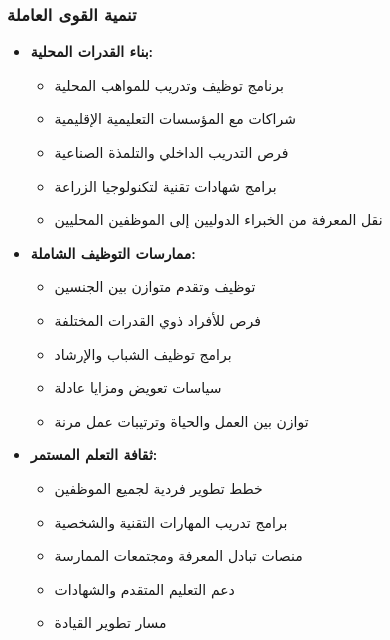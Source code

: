 \subsubsection{تنمية القوى العاملة}
\begin{itemize}
    \item \textbf{بناء القدرات المحلية:}
    \begin{itemize}
        \item برنامج توظيف وتدريب للمواهب المحلية
        \item شراكات مع المؤسسات التعليمية الإقليمية
        \item فرص التدريب الداخلي والتلمذة الصناعية
        \item برامج شهادات تقنية لتكنولوجيا الزراعة
        \item نقل المعرفة من الخبراء الدوليين إلى الموظفين المحليين
    \end{itemize}
    
    \item \textbf{ممارسات التوظيف الشاملة:}
    \begin{itemize}
        \item توظيف وتقدم متوازن بين الجنسين
        \item فرص للأفراد ذوي القدرات المختلفة
        \item برامج توظيف الشباب والإرشاد
        \item سياسات تعويض ومزايا عادلة
        \item توازن بين العمل والحياة وترتيبات عمل مرنة
    \end{itemize}
    
    \item \textbf{ثقافة التعلم المستمر:}
    \begin{itemize}
        \item خطط تطوير فردية لجميع الموظفين
        \item برامج تدريب المهارات التقنية والشخصية
        \item منصات تبادل المعرفة ومجتمعات الممارسة
        \item دعم التعليم المتقدم والشهادات
        \item مسار تطوير القيادة
    \end{itemize}
\end{itemize}


